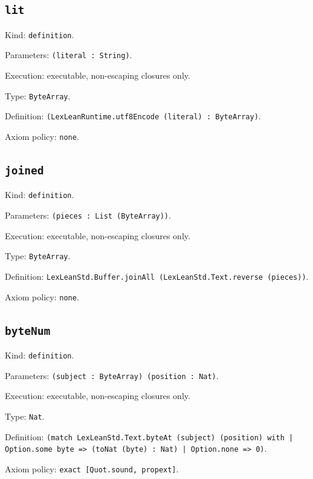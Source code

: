 \documentclass[11pt]{article}
\begin{document}
\subsection*{\texttt{lit}}
\noindent Kind: \texttt{definition}.\par
\noindent Parameters: \texttt{(literal : String)}.\par
\noindent Execution: executable, non-escaping closures only.\par
\noindent Type: \texttt{ByteArray}.\par
\noindent Definition: \texttt{(LexLeanRuntime.utf8Encode (literal) : ByteArray)}.\par
\noindent Axiom policy: \texttt{none}.\par
\subsection*{\texttt{joined}}
\noindent Kind: \texttt{definition}.\par
\noindent Parameters: \texttt{(pieces : List (ByteArray))}.\par
\noindent Execution: executable, non-escaping closures only.\par
\noindent Type: \texttt{ByteArray}.\par
\noindent Definition: \texttt{LexLeanStd.Buffer.joinAll (LexLeanStd.Text.reverse (pieces))}.\par
\noindent Axiom policy: \texttt{none}.\par
\subsection*{\texttt{byteNum}}
\noindent Kind: \texttt{definition}.\par
\noindent Parameters: \texttt{(subject : ByteArray) (position : Nat)}.\par
\noindent Execution: executable, non-escaping closures only.\par
\noindent Type: \texttt{Nat}.\par
\noindent Definition: \texttt{(match LexLeanStd.Text.byteAt (subject) (position) with | Option.some byte => (toNat (byte) : Nat) | Option.none => 0)}.\par
\noindent Axiom policy: \texttt{exact [Quot.sound, propext]}.\par
\end{document}
